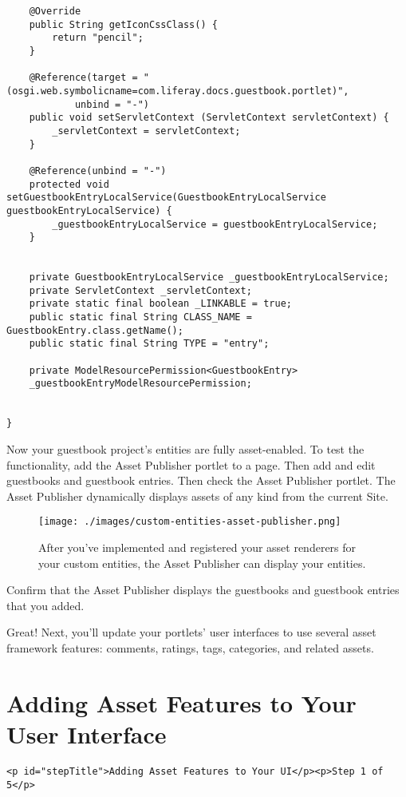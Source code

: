 \begin{verbatim}
    @Override
    public String getIconCssClass() {
        return "pencil";
    }

    @Reference(target = "(osgi.web.symbolicname=com.liferay.docs.guestbook.portlet)",
            unbind = "-")
    public void setServletContext (ServletContext servletContext) {
        _servletContext = servletContext;
    }

    @Reference(unbind = "-")
    protected void setGuestbookEntryLocalService(GuestbookEntryLocalService guestbookEntryLocalService) {
        _guestbookEntryLocalService = guestbookEntryLocalService;
    }


    private GuestbookEntryLocalService _guestbookEntryLocalService;
    private ServletContext _servletContext;
    private static final boolean _LINKABLE = true;
    public static final String CLASS_NAME = GuestbookEntry.class.getName();
    public static final String TYPE = "entry";

    private ModelResourcePermission<GuestbookEntry>
    _guestbookEntryModelResourcePermission;


}
\end{verbatim}

Now your guestbook project's entities are fully asset-enabled. To test
the functionality, add the Asset Publisher portlet to a page. Then add
and edit guestbooks and guestbook entries. Then check the Asset
Publisher portlet. The Asset Publisher dynamically displays assets of
any kind from the current Site.

\begin{figure}
\centering
\texttt{[image: ./images/custom-entities-asset-publisher.png]}
\caption{After you've implemented and registered your asset renderers
for your custom entities, the Asset Publisher can display your
entities.}
\end{figure}

Confirm that the Asset Publisher displays the guestbooks and guestbook
entries that you added.

Great! Next, you'll update your portlets' user interfaces to use several
asset framework features: comments, ratings, tags, categories, and
related assets.

\chapter{Adding Asset Features to Your User
Interface}\label{adding-asset-features-to-your-user-interface}

\begin{verbatim}
<p id="stepTitle">Adding Asset Features to Your UI</p><p>Step 1 of 5</p>
\end{verbatim}

